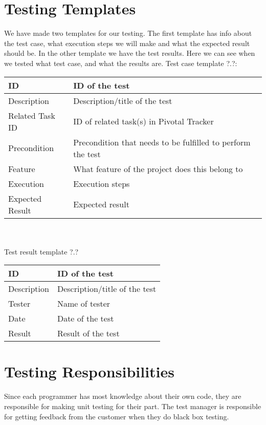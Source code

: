 \documentclass{report}
\begin{document}
\section{Testing Templates} \label{sec:testing_templates}
We have made two templates for our testing. The first template has info about the test case, what execution steps we will make and what the expected result should be. In the other template we have the test results. Here we can see when we tested what test case, and what the results are.
Test case template ?.?:\\
\begin{tabular}{| l | p{9 cm} |} \hline
ID & ID of the test \\ \hline
Description & Description/title of the test \\ \hline
Related Task ID & ID of related task(s) in Pivotal Tracker \\ \hline %
Precondition & Precondition that needs to be fulfilled to perform the test \\ \hline
Feature & What feature of the project does this belong to \\ \hline
Execution & Execution steps\\ \hline
Expected Result & Expected result\\ \hline
\end{tabular}\\\\
Test result template ?.?\\
\begin{tabular}{| l | l |} \hline
ID & ID of the test \\ \hline
Description & Description/title of the test \\ \hline
Tester & Name of tester \\ \hline
Date & Date of the test\\ \hline
Result & Result of the test\\ \hline
\end{tabular}

\newpage
\section{Testing Responsibilities} \label{sec:testing_responsibilities}
Since each programmer has most knowledge about their own code, they are responsible for making unit testing for their part. The test manager is responsible for getting feedback from the customer when they do black box testing.
\end{document}
